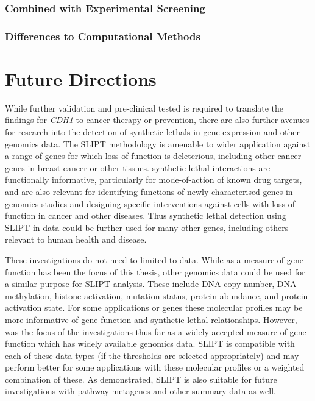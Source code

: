 \subsubsection{Combined with Experimental Screening}
\label{chapt6:slipt_compare_experimental}

\subsubsection{Differences to Computational Methods}
\label{chapt6:slipt_compare_computational}
\fi

\section{Future Directions}
\label{chapt6:future}

While further validation and pre-clinical tested is required to translate the findings for \textit{CDH1} to cancer therapy or prevention, there are also further avenues for research into the detection of \glspl{synthetic lethal} in \gls{gene expression} and other \glspl{genomic} data. The \gls{SLIPT} methodology is amenable to wider application against a range of genes for which loss of function is deleterious, including other cancer genes in breast cancer or other tissues. \Gls{synthetic lethal} interactions are functionally informative, particularly for mode-of-action of known drug targets, and are also relevant for identifying functions of newly characterised genes in \glspl{genomic} studies and designing specific interventions against cells with loss of function in cancer and other diseases. Thus \gls{synthetic lethal} detection using \gls{SLIPT} in  data could be further used for many other genes, including others relevant to human health and disease.

These investigations do not need to limited to  data. While  as a measure of gene function has been the focus of this thesis, other \glspl{genomic} data could be used for a similar purpose for \gls{SLIPT} analysis. These include \acrshort{DNA} \gls{copy number}, \acrshort{DNA} methylation, histone activation, \gls{mutation} status, protein abundance, and protein activation state. For some applications or genes these molecular profiles may be more informative of gene function and \gls{synthetic lethal} relationships. However,  was the focus of the investigations thus far as a widely accepted measure of gene function which has widely available \glspl{genomic} data.  \gls{SLIPT} is compatible with each of these data types (if the thresholds are selected appropriately) and may perform better for some applications with these molecular profiles or a weighted combination of these. As demonstrated, \gls{SLIPT} is also suitable for future investigations with pathway \glspl{metagene} and other summary data as well.

